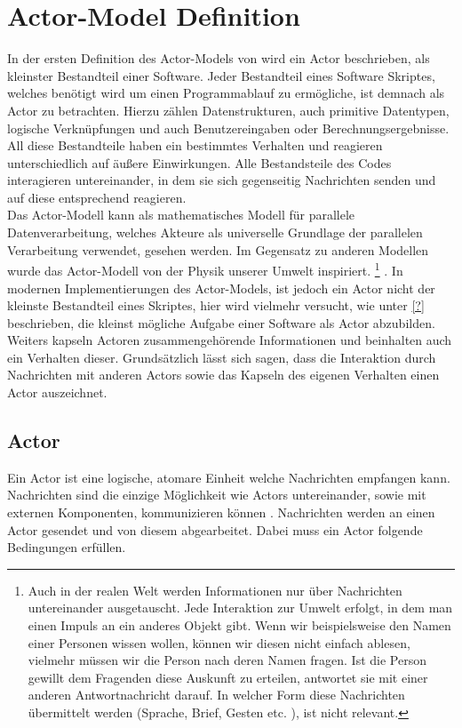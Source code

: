 \section{Actor-Model Definition}\label{actor:definition}
In der ersten Definition des Actor-Models von \citep{hewitt1973session} wird ein Actor beschrieben, als kleinster Bestandteil einer Software. Jeder Bestandteil eines Software Skriptes, welches benötigt wird um einen Programmablauf zu ermögliche, ist demnach als Actor zu betrachten. Hierzu zählen Datenstrukturen, auch primitive Datentypen, logische Verknüpfungen und auch Benutzereingaben oder Berechnungsergebnisse. All diese Bestandteile haben ein bestimmtes Verhalten und reagieren unterschiedlich auf äußere Einwirkungen. Alle Bestandsteile des Codes interagieren untereinander, in dem sie sich gegenseitig Nachrichten senden und auf diese entsprechend reagieren.\\
Das Actor-Modell kann als mathematisches Modell für parallele Datenverarbeitung, welches Akteure als universelle Grundlage der parallelen Verarbeitung verwendet, gesehen werden. Im Gegensatz zu anderen Modellen wurde das Actor-Modell von der Physik unserer Umwelt inspiriert. \footnote{Auch in der realen Welt werden Informationen nur über Nachrichten untereinander ausgetauscht. Jede Interaktion zur Umwelt erfolgt, in dem man einen Impuls an ein anderes Objekt gibt. Wenn wir beispielsweise den Namen einer Personen wissen wollen, können wir diesen nicht einfach ablesen, vielmehr müssen wir die Person nach deren Namen fragen. Ist die Person gewillt dem Fragenden diese Auskunft zu erteilen, antwortet sie mit einer anderen Antwortnachricht darauf. In welcher Form diese Nachrichten übermittelt werden (Sprache, Brief, Gesten etc. ), ist nicht relevant.} \citep{Vernon2015ReactiveAkka} .  In modernen Implementierungen des Actor-Models, ist jedoch ein Actor nicht der kleinste Bestandteil eines Skriptes, hier wird vielmehr versucht, wie unter \ref{?}  beschrieben, die kleinst mögliche Aufgabe einer Software als Actor abzubilden. \\
Weiters kapseln Actoren zusammengehörende Informationen und beinhalten auch ein Verhalten dieser.  Grundsätzlich lässt sich sagen, dass die Interaktion durch Nachrichten mit anderen Actors sowie das Kapseln des eigenen Verhalten einen Actor auszeichnet.

\subsection{Actor}
Ein Actor ist eine logische, atomare Einheit welche Nachrichten empfangen kann. Nachrichten sind die einzige Möglichkeit wie Actors untereinander, sowie mit externen Komponenten, kommunizieren können \citep{Agha1985ConcurrentParallelism}. Nachrichten werden an einen Actor gesendet und von diesem abgearbeitet. Dabei muss ein Actor folgende Bedingungen erfüllen.

